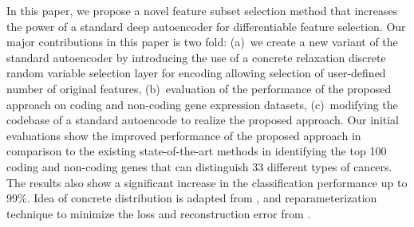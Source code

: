 \documentclass{bioinfo}
\begin{document}
In this paper, we propose a novel feature subset selection method that increases the power of a standard deep autoencoder for differentiable feature selection. 
Our major contributions in this paper is two fold: (a)~we create a new variant of the standard autoencoder by introducing the use of a concrete relaxation discrete random variable selection layer for encoding allowing selection of user-defined number of original features, (b)~evaluation of the performance of the proposed approach on coding and non-coding gene expression datasets, (c)~modifying the codebase of a standard autoencode to realize the proposed approach. Our initial evaluations show the improved performance of the proposed approach in comparison to the existing state-of-the-art methods in identifying the top 100 coding and non-coding genes that can distinguish 33 different types of cancers.
The results also show a significant increase in the classification performance up to 99\%.
Idea of concrete distribution is adapted from \citep{maddison2016concrete, kingma2013auto}, and reparameterization technique to minimize the loss and reconstruction error from \citep{abid2019concrete}.
\end{document}
